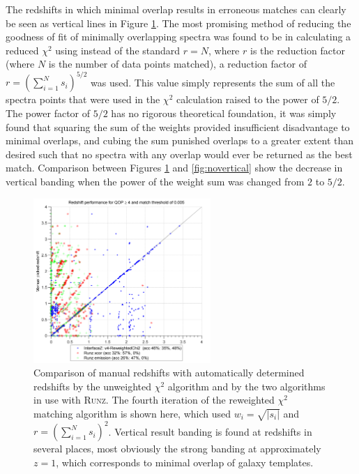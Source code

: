 \documentclass[titlesmallcaps, examinerscopy, copyrightpage]{uqthesis}
\newcommand{\runz}{\textsc{Runz}}
\newcommand{\brac}[1]{\left( #1 \right)}
\newcommand\abs[1]{\left|#1\right|}
\begin{document}
The redshifts in which minimal overlap results in erroneous matches can clearly be seen as vertical lines in Figure \ref{fig:vertical}. The most promising method of reducing the goodness of fit of minimally overlapping spectra was found to be in calculating a reduced $\chi^2$ using instead of the standard $r = N$, where $r$ is the reduction factor (where $N$ is the number of data points matched), a reduction factor of $r = \brac{\sum_{i=1}^N s_i}^{5/2}$ was used. This value simply represents the sum of all the spectra points that were used in the $\chi^2$ calculation raised to the power of $5/2$. The power factor of $5/2$ has no rigorous theoretical foundation, it was simply found that squaring the sum of the weights provided insufficient disadvantage to minimal overlaps, and cubing the sum punished overlaps to a greater extent than desired such that no spectra with any overlap would ever be returned as the best match. Comparison between Figures \ref{fig:vertical} and \ref{fig:novertical} show the decrease in vertical banding when the power of the weight sum was changed from $2$ to $5/2$.

\begin{figure}[ht!]
\includegraphics[width=0.6\textwidth]{images/Fullv4-ReweightedChi2.png} 
\centering
\caption{Comparison of manual redshifts with automatically determined redshifts by the unweighted $\chi^2$ algorithm and by the two algorithms in use with \runz{}. The fourth iteration of the reweighted $\chi^2$ matching algorithm is shown here, which used $w_i = \sqrt{\abs{s_i}}$ and $r = \brac{\sum_{i=1}^N s_i}^{2}$. Vertical result banding is found at redshifts in several places, most obviously the strong banding at approximately $z=1$, which corresponds to minimal overlap of galaxy templates.}
\label{fig:vertical}
\end{figure}
\end{document}
